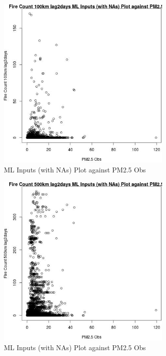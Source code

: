 \begin{figure} 
\centering  
\includegraphics[width=0.77\textwidth]{Code_Outputs/Report_ML_input_PM25_Step4_part_e_de_duplicated_aves_compiled_2019-05-18wNAs_Fire_Count_100km_lag2daysvPM25_Obs.jpg} 
\caption{\label{fig:Report_ML_input_PM25_Step4_part_e_de_duplicated_aves_compiled_2019-05-18wNAsFire_Count_100km_lag2daysvPM25_Obs}ML Inputs (with NAs) Plot against PM2.5 Obs} 
\end{figure} 
 

\begin{figure} 
\centering  
\includegraphics[width=0.77\textwidth]{Code_Outputs/Report_ML_input_PM25_Step4_part_e_de_duplicated_aves_compiled_2019-05-18wNAs_Fire_Count_500km_lag2daysvPM25_Obs.jpg} 
\caption{\label{fig:Report_ML_input_PM25_Step4_part_e_de_duplicated_aves_compiled_2019-05-18wNAsFire_Count_500km_lag2daysvPM25_Obs}ML Inputs (with NAs) Plot against PM2.5 Obs} 
\end{figure} 
 

